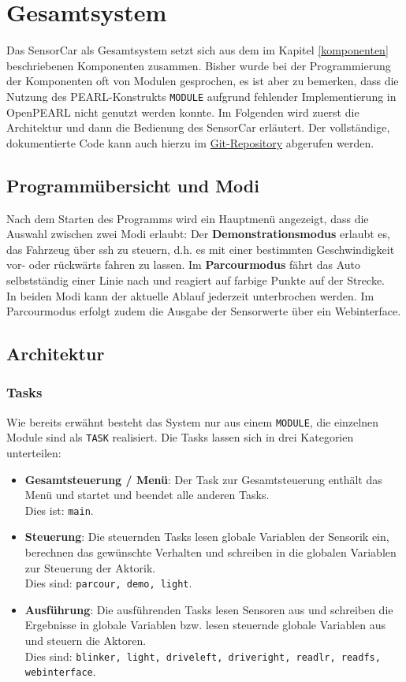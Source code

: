 \chapter{Gesamtsystem}
Das SensorCar als Gesamtsystem setzt sich aus dem im Kapitel \ref{komponenten} beschriebenen Komponenten zusammen. Bisher wurde bei der Programmierung der Komponenten oft von Modulen gesprochen, es ist aber zu bemerken, dass die Nutzung des PEARL-Konstrukts \texttt{MODULE} aufgrund fehlender Implementierung in OpenPEARL nicht genutzt werden konnte. Im Folgenden wird zuerst die Architektur und dann die Bedienung des SensorCar erläutert. Der vollständige, dokumentierte Code kann auch hierzu im \href{https://github.com/OpenPearl-HFUWPV1718/SensorCar}{Git-Repository} abgerufen werden.

\section{Programmübersicht und Modi}
Nach dem Starten des Programms wird ein Hauptmenü angezeigt, dass die Auswahl zwischen zwei Modi erlaubt:
Der \textbf{Demonstrationsmodus} erlaubt es, das Fahrzeug über ssh zu steuern, d.h. es mit einer bestimmten Geschwindigkeit vor- oder rückwärts fahren zu lassen.
Im \textbf{Parcourmodus} fährt das Auto selbstständig einer Linie nach und reagiert auf farbige Punkte auf der Strecke.\\
In beiden Modi kann der aktuelle Ablauf jederzeit unterbrochen werden. Im Parcourmodus erfolgt zudem die Ausgabe der Sensorwerte über ein Webinterface.  

\section{Architektur}
\subsection{Tasks}
Wie bereits erwähnt besteht das System nur aus einem \texttt{MODULE}, die einzelnen Module sind als \texttt{TASK} realisiert. Die Tasks lassen sich in drei Kategorien unterteilen:
\begin{itemize}
	\item \textbf{Gesamtsteuerung / Menü}: Der Task zur Gesamtsteuerung enthält das Menü und startet und beendet alle anderen Tasks.\\
	Dies ist: \texttt{main}.
	\item \textbf{Steuerung}: Die steuernden Tasks lesen globale Variablen der Sensorik ein, berechnen das gewünschte Verhalten und schreiben in die globalen Variablen zur Steuerung der Aktorik. \\
	Dies sind: \texttt{parcour, demo, light}.
	\item \textbf{Ausführung}: Die ausführenden Tasks lesen Sensoren aus und schreiben die Ergebnisse in globale Variablen bzw. lesen steuernde globale Variablen aus und steuern die Aktoren.\\
	Dies sind: \texttt{blinker, light, driveleft, driveright, readlr, readfs, webinterface}.
\end{itemize}

